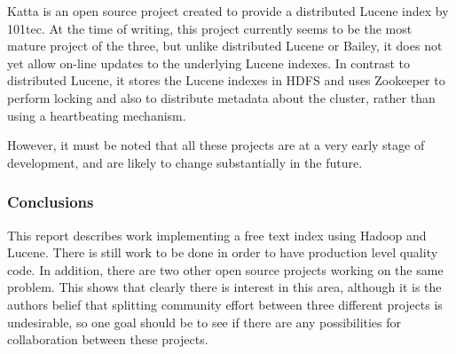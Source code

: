\documentclass[a4paper,10pt]{article}
\begin{document}
Katta \cite{katta} is an open source project created to provide a distributed Lucene index by 101tec. At the time of writing, this project currently seems to be the most mature project of the three, but unlike distributed Lucene or Bailey, it does not yet allow on-line updates to the underlying Lucene indexes. In contrast to distributed Lucene, it stores the Lucene indexes in HDFS and uses Zookeeper \cite{zookeeper} to perform locking and also to distribute metadata about the cluster, rather than using a heartbeating mechanism.

However, it must be noted that all these projects are at a very early stage of development, and are likely to change substantially in the future.

\subsubsection{Conclusions}

This report describes work implementing a free text index using Hadoop and Lucene. There is still work to be done in order to have production level quality code. In addition, there are two other open source projects working on the same problem. This shows that clearly there is interest in this area, although it is the authors belief that splitting community effort between three different projects is undesirable, so one goal should be to see if there are any possibilities for collaboration between these projects. 


 
\end{document}
